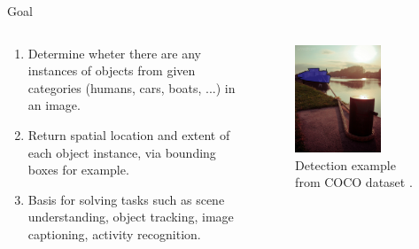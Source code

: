 \documentclass{beamer}
\begin{document}
\begin{frame}{Goal}
    \begin{columns}
        \begin{column}{0.5\textwidth}
            \begin{enumerate}
                \item Determine wheter there are any instances of objects from given categories (humans, cars, boats, ...) in an image.
                \item Return spatial location and extent of each object instance, via bounding boxes for example.
                \item Basis for solving tasks such as scene understanding, object tracking, image captioning, activity recognition.
            \end{enumerate}
        \end{column}
        \begin{column}{0.5\textwidth}
            \begin{figure}
            \centering
                \includegraphics[width=0.7\textwidth]{images/detection.png}
                \caption{Detection example from COCO dataset \cite{lin_microsoft_2015}.}
            \end{figure}
        \end{column}
    \end{columns}
\end{frame}
\end{document}
